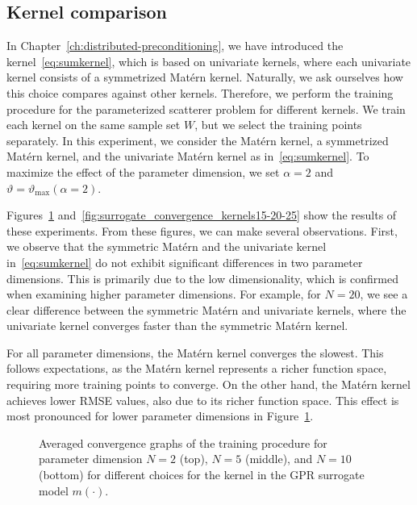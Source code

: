 \subsection{Kernel comparison}\label{subsec:kernel-comparison}
In Chapter~\ref{ch:distributed-preconditioning}, we have introduced the kernel~\eqref{eq:sumkernel}, which is based on univariate kernels, where each univariate kernel consists of a symmetrized Matérn kernel.
Naturally, we ask ourselves how this choice compares against other kernels.
Therefore, we perform the training procedure for the parameterized scatterer problem for different kernels.
We train each kernel on the same sample set $W$, but we select the training points separately.
In this experiment, we consider the Matérn kernel, a symmetrized Matérn kernel, and the univariate Matérn kernel as in~\eqref{eq:sumkernel}.
To maximize the effect of the parameter dimension, we set $\alpha=2$ and $\vartheta = \vartheta_{\max}(\alpha=2)$.

Figures~\ref{fig:surrogate_convergence_kernels2-5-10} and~\ref{fig:surrogate_convergence_kernels15-20-25} show the results of these experiments.
From these figures, we can make several observations.
First, we observe that the symmetric Matérn and the univariate kernel in~\eqref{eq:sumkernel} do not exhibit significant differences in two parameter dimensions.
This is primarily due to the low dimensionality, which is confirmed when examining higher parameter dimensions.
For example, for $N=20$, we see a clear difference between the symmetric Matérn and univariate kernels, where the univariate kernel converges faster than the symmetric Matérn kernel.

For all parameter dimensions, the Matérn kernel converges the slowest.
This follows expectations, as the Matérn kernel represents a richer function space, requiring more training points to converge.
On the other hand, the Matérn kernel achieves lower RMSE values, also due to its richer function space.
This effect is most pronounced for lower parameter dimensions in Figure~\ref{fig:surrogate_convergence_kernels2-5-10}.

\begin{figure}
    \centering
    \begin{subfigure}[b]{\textwidth}
        \vspace{-5pt}
    \end{subfigure}
    \begin{subfigure}[b]{\textwidth}
        \vspace{-5pt}
    \end{subfigure}
    \begin{subfigure}[b]{\textwidth}
        \vspace{-5pt}
    \end{subfigure}
    \caption{Averaged convergence graphs of the training procedure for parameter dimension $N=2$ (top), $N=5$ (middle), and $N=10$ (bottom) for different choices for the kernel in the GPR surrogate model $m(\cdot)$. }\label{fig:surrogate_convergence_kernels2-5-10}
\end{figure}

